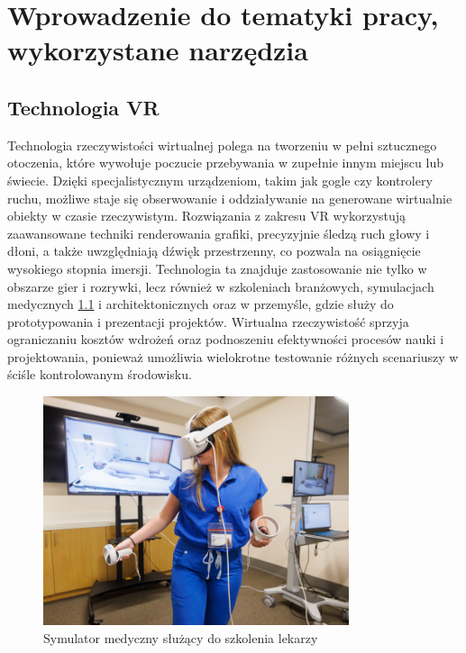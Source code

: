 \chapter{Wprowadzenie do tematyki pracy, wykorzystane narzędzia}
\section{Technologia VR}
Technologia rzeczywistości wirtualnej polega na tworzeniu w pełni sztucznego otoczenia, które wywołuje poczucie przebywania w zupełnie innym miejscu lub świecie. Dzięki specjalistycznym urządzeniom, takim jak gogle czy kontrolery ruchu, możliwe staje się obserwowanie i oddziaływanie na generowane wirtualnie obiekty w czasie rzeczywistym. Rozwiązania z zakresu VR wykorzystują zaawansowane techniki renderowania grafiki, precyzyjnie śledzą ruch głowy i dłoni, a także uwzględniają dźwięk przestrzenny, co pozwala na osiągnięcie wysokiego stopnia imersji. Technologia ta znajduje zastosowanie nie tylko w obszarze gier i rozrywki, lecz również w szkoleniach branżowych, symulacjach medycznych \ref{vr_example} i architektonicznych oraz w przemyśle, gdzie służy do prototypowania i prezentacji projektów. Wirtualna rzeczywistość sprzyja ograniczaniu kosztów wdrożeń oraz podnoszeniu efektywności procesów nauki i projektowania, ponieważ umożliwia wielokrotne testowanie różnych scenariuszy w ściśle kontrolowanym środowisku.

\begin{figure}[!htb]
    \centering
    \includegraphics[width=0.8\textwidth]{images/vr_example.jpg}
    \caption{Symulator medyczny służący do szkolenia lekarzy}
    \label{vr_example}
\end{figure}\textbf{}


